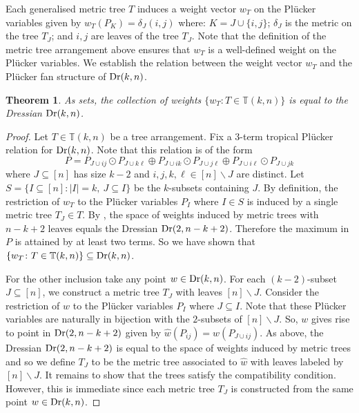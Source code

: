 \documentclass[12pt]{article}
\newcommand{\TT}{\mathbb{T}}
\DeclareMathOperator{\Dr}{\rm Dr}
\theoremstyle{plain}
\newtheorem{theorem}{Theorem}
\theoremstyle{definition}
\numberwithin{subcase}{case}
\begin{document}
Each generalised metric tree $T$ induces a weight vector $w_T$ on the Pl\"ucker variables given by $w_T(P_K) = \delta_J(i,j)$ where: $K = J \cup \{i,j\}$; $\delta_J$ is the metric on the tree $T_J$; and $i,j$ are leaves of the tree $T_J$. Note that the definition of the metric tree arrangement above ensures that $w_T$ is a well-defined weight on the Pl\"ucker variables. We establish the relation between the weight vector $w_{T}$ and the Pl\"ucker fan structure of $\Dr(k,n)$.

\begin{theorem}\label{prop:gen_tree_dressian}
As sets, the collection of weights $\{w_T \colon T \in \TT(k,n) \}$ is equal to the Dressian $\Dr(k,n)$.
\end{theorem}

\begin{proof}
Let $T \in \TT(k,n)$ be a tree arrangement. Fix a $3$-term tropical Pl\"ucker relation for $\Dr(k,n)$. Note that this relation is of the form
\[
P = 
P_{J \cup ij} \odot P_{J \cup k\ell} \oplus
P_{J \cup ik} \odot P_{J \cup j\ell} \oplus
P_{J \cup i\ell} \odot P_{J \cup jk} 
\]
where $J \subseteq [n]$ has size $k - 2$ and $i,j,k,\ell \in [n] \backslash J$ are distinct. Let $S = \{I \subseteq [n] \colon |I| = k, \ J \subseteq I \}$ be the $k$-subsets containing $J$. By definition, the restriction of $w_T$ to the Pl\"ucker variables $P_I$ where $I \in S$ is induced by a single metric tree $T_J \in T$. By \cite{speyer2004tropical}, the space of weights induced by metric trees with $n-k+2$ leaves equals the Dressian $\Dr(2, n-k+2)$. Therefore the maximum in $P$ is attained by at least two terms. So we have shown that $\{w_T \colon T \in \TT(k,n) \} \subseteq \Dr(k,n)$.

For the other inclusion take any point $w \in \Dr(k,n)$. For each $(k-2)$-subset $J \subseteq [n]$, we construct a metric tree $T_J$ with leaves $[n]\backslash J$. Consider the restriction of $w$ to the Pl\"ucker variables $P_I$ where $J \subseteq I$. Note that these Pl\"ucker variables are naturally in bijection with the $2$-subsets of $[n]\backslash J$. So, $w$ gives rise to point in $\Dr(2, n-k+2)$ given by $\hat w(P_{ij}) = w(P_{J \cup ij})$. As above, the Dressian $\Dr(2, n-k+2)$ is equal to the space of weights induced by metric trees and so we define $T_J$ to be the metric tree associated to $\hat w$ with leaves labeled by $[n] \backslash J$. It remains to show that the trees satisfy the compatibility condition. However, this is immediate since each metric tree $T_J$ is constructed from the same point $w \in \Dr(k,n)$.
\end{proof}
\end{document}
